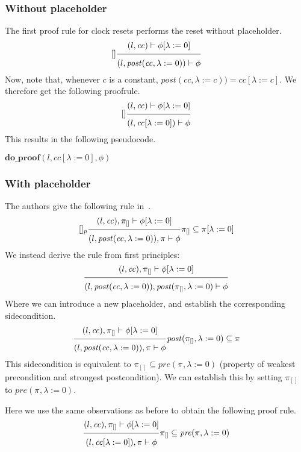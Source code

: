 \documentclass{article}
\newcommand{\proofrule}[3][]{#1 \frac{\raisebox{.7ex}{\normalsize{$#2$}}}
  {\raisebox{-1.0ex}{\normalsize{$#3$}}}}
\newcommand{\placeholder}[1][]{\pi_{#1}}
\newcommand{\loc}{l}
\newcommand{\region}{\mathit{cc}}
\newcommand{\post}{\mathit{post}}
\newcommand{\method}[1]{\ensuremath{\mathbf{#1}}}
\begin{document}
\subsubsection{Without placeholder}
The first proof rule for clock resets performs the reset without placeholder.
\[
\proofrule[{[]}]
{(\loc, \region) \vdash \phi[\lambda := 0]}
{(\loc, \post(\region, \lambda := 0)) \vdash \phi}
\]
Now, note that, whenever $c$ is a constant, $\post(\region, \lambda := c)) = \region[\lambda := c]$. We therefore get the following proofrule.
\[
  \proofrule[{[]}]
  {(\loc, \region) \vdash \phi[\lambda := 0]}
  {(\loc, \region[\lambda := 0]) \vdash \phi}
\]
%
This results in the following pseudocode.
\begin{algorithm}[H]
  \caption{$\method{do\_proof\_reset}(\loc, \region, \phi[\lambda := 0]$}
  \begin{algorithmic}
  \RETURN $\method{do\_proof}(\loc, \region[\lambda := 0], \phi)$
  \end{algorithmic}
  \end{algorithm}

\subsubsection{With placeholder}

The authors give the following rule in~\cite{FC:14report}.
\[
\proofrule[{[]_p}]
{(\loc, \region), \placeholder[{[]}] \vdash \phi[\lambda := 0]}
{(\loc, \post(\region, \lambda := 0)), \placeholder \vdash \phi}
\placeholder[{[]}] \subseteq \placeholder[][\lambda := 0]
\]
We instead derive the rule from first principles:
\[
\proofrule
{(\loc, \region), \placeholder[{[]}] \vdash \phi[\lambda := 0]}
{(\loc, \post(\region, \lambda := 0)), \post(\placeholder[{[]}], \lambda := 0)\vdash \phi}
\]
Where we can introduce a new placeholder, and establish the corresponding sidecondition.
\[
\proofrule
{(\loc, \region), \placeholder[{[]}] \vdash \phi[\lambda := 0]}
{(\loc, \post(\region, \lambda := 0)), \placeholder \vdash \phi}
\post(\placeholder[{[]}], \lambda := 0) \subseteq \placeholder
\]
This sidecondition is equivalent to $\placeholder[{[]}] \subseteq \mathit{pre}(\placeholder, \lambda := 0)$ (property of weakest precondition and strongest postcondition). We can establish this by setting  $\placeholder[{[]}]$ to $\mathit{pre}(\placeholder, \lambda := 0)$.

Here we use the same observations as before to obtain the following proof rule.
\[
\proofrule
{(\loc, \region), \placeholder[{[]}] \vdash \phi[\lambda := 0]}
{(\loc, \region[\lambda := 0]), \placeholder \vdash \phi}
\placeholder[{[]}] \subseteq \mathit{pre}(\placeholder, \lambda := 0)
\]
\end{document}
